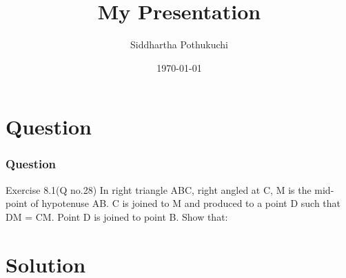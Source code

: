 \documentclass{beamer}
\title{My Presentation}
\author{Siddhartha Pothukuchi}
\institute{Indian Institute of Technology, Bhilai.}
\date{\today}
\begin{document}
\begin{frame}
\titlepage
\end{frame}
\section{Question}
\begin{frame}
\frametitle{Question}
\begin{block}{Exercise 8.1(Q no.28)}
In right triangle ABC, right angled at C, M is
the mid-point of hypotenuse AB. C is joined to
M and produced to a point D such that DM =
CM. Point D is joined to point B. Show that:
\newline
\hyperlink{a}{}
\newline
\hyperlink{b}{}
\newline
\hyperlink{c}{}
\newline
\hyperlink{d}{}

\end{block}
\end{frame}

\section{Solution}
\end{document}
